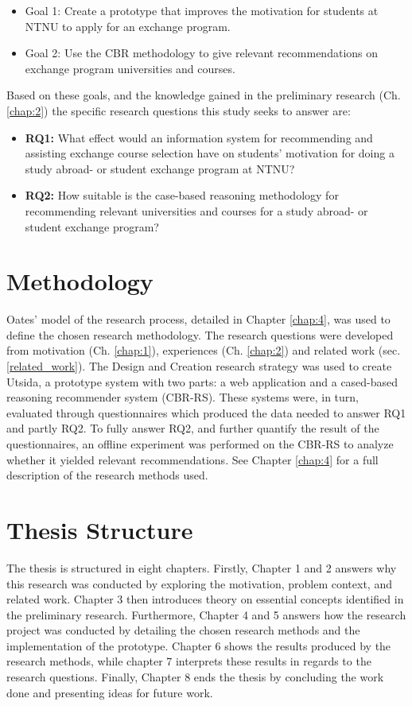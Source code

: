 \begin{itemize}[noitemsep]
    \item Goal 1: Create a prototype that improves the motivation for students at NTNU to apply for an exchange program.
    \item Goal 2: Use the CBR methodology to give relevant recommendations on exchange program universities and courses.
\end{itemize}

Based on these goals, and the knowledge gained in the preliminary research (Ch. \ref{chap:2}) the specific research questions this study seeks to answer are:

\begin{itemize}
    \item \textbf{RQ1:} What effect would an information system for recommending and assisting exchange course selection have on students' motivation for doing a study abroad- or student exchange program at NTNU?
    \item \textbf{RQ2:} How suitable is the case-based reasoning methodology for recommending relevant universities and courses for a study abroad- or student exchange program?
\end{itemize}


\section{Methodology}
Oates' \cite{oates2005researching} model of the research process, detailed in Chapter \ref{chap:4}, was used to define the chosen research methodology. The research questions were developed from motivation (Ch. \ref{chap:1}), experiences (Ch. \ref{chap:2}) and related work (sec. \ref{related_work}). The Design and Creation research strategy was used to create Utsida, a prototype system with two parts: a web application and a cased-based reasoning recommender system (CBR-RS). These systems were, in turn, evaluated through questionnaires which produced the data needed to answer RQ1 and partly RQ2. To fully answer RQ2, and further quantify the result of the questionnaires, an offline experiment was performed on the CBR-RS to analyze whether it yielded relevant recommendations. See Chapter \ref{chap:4} for a full description of the research methods used.
    

\section{Thesis Structure}
The thesis is structured in eight chapters. Firstly, Chapter 1 and 2 answers why this research was conducted by exploring the motivation, problem context, and related work. Chapter 3 then introduces theory on essential concepts identified in the preliminary research. Furthermore, Chapter 4 and 5 answers how the research project was conducted by detailing the chosen research methods and the implementation of the prototype. Chapter 6 shows the results produced by the research methods, while chapter 7 interprets these results in regards to the research questions. Finally, Chapter 8 ends the thesis by concluding the work done and presenting ideas for future work. 

